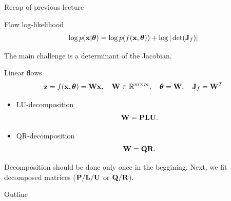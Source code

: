 \begin{frame}{Recap of previous lecture}
	\vspace{-0.5cm}
	\begin{block}{Flow log-likelihood}
		\vspace{-0.3cm}
		\[
			\log p(\mathbf{x}|\boldsymbol{\theta}) = \log p(f(\mathbf{x}, \boldsymbol{\theta})) + \log  |\det (\mathbf{J}_f)|
		\]
		\vspace{-0.5cm}
	\end{block}
	The main challenge is a determinant of the Jacobian.
	\begin{block}{Linear flows}	
		\vspace{-0.2cm}
		\[
			\mathbf{z} = f(\mathbf{x}, \boldsymbol{\theta}) = \mathbf{W} \mathbf{x}, \quad \mathbf{W} \in \mathbb{R}^{m \times m}, \quad \boldsymbol{\theta} = \mathbf{W}, \quad \mathbf{J}_f = \mathbf{W}^T
		\]
	\end{block}
	\vspace{-0.3cm}
	\begin{itemize}
		\item LU-decomposition
		\[
			\mathbf{W} = \mathbf{P} \mathbf{L} \mathbf{U}.
		\]
		\item QR-decomposition
		\[
			\mathbf{W} = \mathbf{Q} \mathbf{R}.
		\]
	\end{itemize}
	Decomposition should be done only once in the beggining. Next, we fit decomposed matrices ($\mathbf{P}/\mathbf{L}/\mathbf{U}$ or $\mathbf{Q}/\mathbf{R}$).
\end{frame}
\begin{frame}{Outline}
	\tableofcontents
\end{frame}
